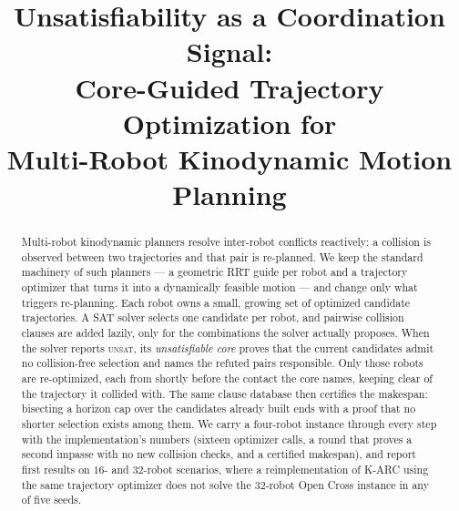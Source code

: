 \documentclass[conference]{IEEEtran}
\theoremstyle{plain}
\theoremstyle{definition}
\begin{document}
\title{Unsatisfiability as a Coordination Signal:\\
Core-Guided Trajectory Optimization for\\
Multi-Robot Kinodynamic Motion Planning}

\author{
}

\maketitle

\begin{abstract}
Multi-robot kinodynamic planners resolve inter-robot conflicts reactively: a collision is
observed between two trajectories and that pair is re-planned. We keep the standard
machinery of such planners --- a geometric RRT guide per robot and a trajectory optimizer
that turns it into a dynamically feasible motion --- and change only what triggers
re-planning. Each robot owns a small, growing set of optimized candidate trajectories. A SAT
solver selects one candidate per robot, and pairwise collision clauses are added lazily, only
for the combinations the solver actually proposes. When the solver reports \textsc{unsat},
its \emph{unsatisfiable core} proves that the current candidates admit no collision-free
selection and names the refuted pairs responsible. Only those robots are re-optimized, each
from shortly before the contact the core names, keeping clear of the trajectory it collided
with. The same clause database then certifies the makespan: bisecting a horizon cap over the
candidates already built ends with a proof that no shorter selection exists among them. We
carry a four-robot instance through every step with the implementation's numbers (sixteen
optimizer calls, a round that proves a second impasse with no new collision checks, and a
certified makespan), and report first results on $16$- and $32$-robot scenarios, where a
reimplementation of K-ARC using the same trajectory optimizer does not solve the $32$-robot
Open Cross instance in any of five seeds.
\end{abstract}
\end{document}

